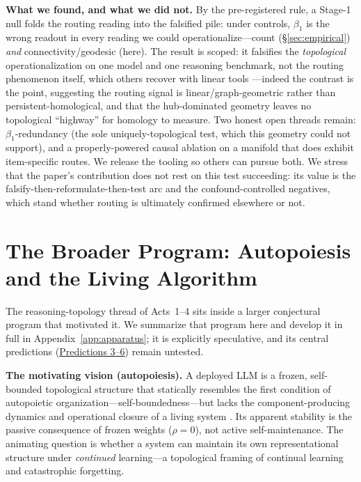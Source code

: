 \documentclass{article}
\begin{document}
\medskip
\noindent\textbf{What we found, and what we did not.} By the pre-registered rule, a Stage-1 null folds
the routing reading into the falsified pile: under controls, $\beta_1$ is the wrong readout in every
reading we could operationalize---count (\S\ref{sec:empirical}) \emph{and} connectivity/geodesic
(here). The result is scoped: it falsifies the \emph{topological} operationalization on one model and
one reasoning benchmark, not the routing phenomenon itself, which others recover with linear tools
\citep{chains2dags2601,reasoningTrajectories2604}---indeed the contrast is the point, suggesting the
routing signal is linear/graph-geometric rather than persistent-homological, and that the hub-dominated
geometry leaves no topological ``highway'' for homology to measure. Two honest open threads remain:
$\beta_1$-redundancy (the sole uniquely-topological test, which this geometry could not support), and a
properly-powered causal ablation on a manifold that does exhibit item-specific routes. We release the
tooling so others can pursue both. We stress that the paper's contribution does not rest on this test
succeeding: its value is the falsify-then-reformulate-then-test arc and the confound-controlled
negatives, which stand whether routing is ultimately confirmed elsewhere or not.

\section{The Broader Program: Autopoiesis and the Living Algorithm}
\label{sec:program}

The reasoning-topology thread of Acts~1--4 sits inside a larger conjectural program that motivated it.
We summarize that program here and develop it in full in Appendix~\ref{app:apparatus}; it is
explicitly speculative, and its central predictions (\hyperref[sec:program-predictions]{Predictions
3--6}) remain untested.

\medskip
\noindent\textbf{The motivating vision (autopoiesis).} A deployed LLM is a frozen, self-bounded
topological structure that statically resembles the first condition of autopoietic
organization---self-boundedness---but lacks the component-producing dynamics and operational closure
of a living system \citep{Varela1974autopoiesis,DiPaolo2005}. Its apparent stability is the passive
consequence of frozen weights ($\rho = 0$), not active self-maintenance. The animating question is
whether a system can maintain its own representational structure under \emph{continued} learning---a
topological framing of continual learning and catastrophic forgetting.
\end{document}
